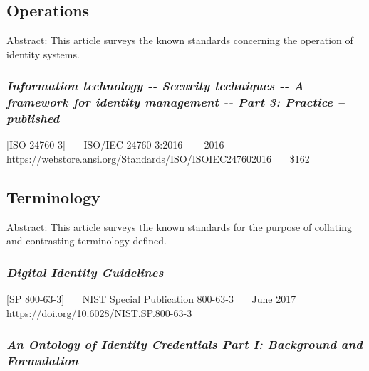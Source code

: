 \hypertarget{operations}{%
\subsection{Operations}\label{operations}}

Abstract: This article surveys the known standards concerning the
operation of identity systems.

\hypertarget{information-technology----security-techniques----a-framework-for-identity-management----part-3-practice-published}{%
\subsubsection{\texorpdfstring{\emph{Information technology -\/- Security
techniques -\/- A framework for identity management -\/- Part 3:
Practice --
published}}{Information technology -\/- Security techniques -\/- A framework for identity management -\/- Part 3: Practice -- published}}\label{information-technology----security-techniques----a-framework-for-identity-management----part-3-practice-published}}

{[}ISO 24760-3{]}~~~ ISO/IEC 24760-3:2016 ~~~ 2016~~~
https://webstore.ansi.org/Standards/ISO/ISOIEC247602016~~~ \$162

\hypertarget{terminology}{%
\subsection{Terminology}\label{terminology}}

Abstract: This article surveys the known standards for the purpose of
collating and contrasting terminology defined.

\hypertarget{digital-identity-guidelines-1}{%
\subsubsection{\texorpdfstring{\emph{Digital Identity
Guidelines}}{Digital Identity Guidelines}}\label{digital-identity-guidelines-1}}

{[}SP 800-63-3{]}~~~ NIST Special Publication 800-63-3~~~ June 2017~~~
https://doi.org/10.6028/NIST.SP.800-63-3~~~

\hypertarget{an-ontology-of-identity-credentials-part-i-background-and-formulation}{%
\subsubsection{\texorpdfstring{\emph{An Ontology of Identity Credentials
Part I: Background and
Formulation}}{An Ontology of Identity Credentials Part I: Background and Formulation}}\label{an-ontology-of-identity-credentials-part-i-background-and-formulation}}

